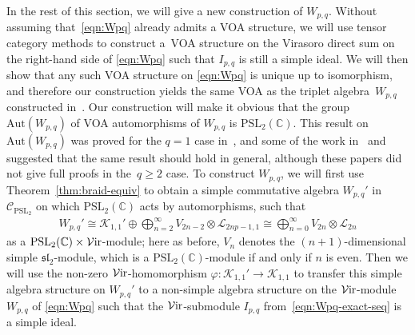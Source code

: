 \documentclass[pdftex]{sigma}
\numberwithin{equation}{section}
\theoremstyle{definition}
\begin{document}
In the rest of this section, we will give a new construction of $W_{p,q}$. Without assuming that~\eqref{eqn:Wpq} already admits a VOA structure, we will use tensor category methods to construct a~VOA structure on the Virasoro direct sum on the right-hand side of \eqref{eqn:Wpq} such that $I_{p,q}$ is still a simple ideal. We will then show that any such VOA structure on \eqref{eqn:Wpq} is unique up to isomorphism, and therefore our construction yields the same VOA as the triplet algebra~$W_{p,q}$ constructed in~\cite{FGST1-Log}. Our construction will make it obvious that the group $\mathrm{Aut}(W_{p,q})$ of VOA automorphisms of $W_{p,q}$ is $\mathrm{PSL}_2(\mathbb{C})$. This result on $\mathrm{Aut}(W_{p,q})$ was proved for the $q=1$ case in~\cite{ALM}, and some of the work in~\cite{FGST1-Log} and \cite{TW2} suggested that the same result should hold in general, although these papers did not give full proofs in the~$q\geq 2$ case. To construct $W_{p,q}$, we will first use Theorem~\ref{thm:braid-equiv} to obtain a simple commutative algebra $W_{p,q}'$ in $\mathcal{C}_{\mathrm{PSL}_2}$ on which $\mathrm{PSL}_2(\mathbb{C})$ acts by automorphisms, such that
\begin{gather}\label{eqn:Wpq'}
W_{p,q}' \cong\mathcal{K}_{1,1}'\oplus\bigoplus_{n=2}^\infty V_{2n-2}\otimes\mathcal{L}_{2np-1,1} \cong\bigoplus_{n=0}^\infty V_{2n}\otimes\mathcal{L}_{2n}
\end{gather}
as a $\mathrm{PSL}_2(\mathbb{C})\times \mathcal{V}{\rm ir}$-module; here as before, $V_n$ denotes the $(n+1)$-dimensional simple $\mathfrak{sl}_2$-module, which is a $\mathrm{PSL}_2(\mathbb{C})$-module if and only if $n$ is even. Then we will use the non-zero $\mathcal{V}{\rm ir}$-homomorphism $\varphi\colon \mathcal{K}_{1,1}'\rightarrow\mathcal{K}_{1,1}$ to transfer this simple algebra structure on $W_{p,q}'$ to a non-simple algebra structure on the $\mathcal{V}{\rm ir}$-module $W_{p,q}$ of \eqref{eqn:Wpq} such that the $\mathcal{V}{\rm ir}$-submodule $I_{p,q}$ from~\eqref{eqn:Wpq-exact-seq} is a simple ideal.
\end{document}
